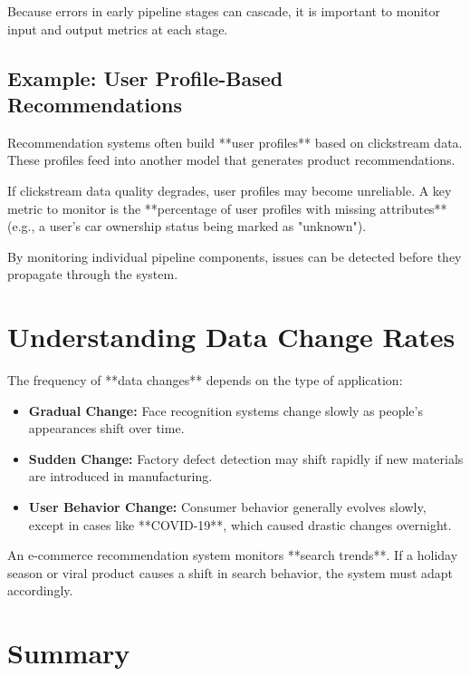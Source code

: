 \documentclass[12pt,openany]{book}
\begin{document}
Because errors in early pipeline stages can cascade, it is important to monitor input and output metrics at each stage.

\subsection{Example: User Profile-Based Recommendations}

Recommendation systems often build **user profiles** based on clickstream data. These profiles feed into another model that generates product recommendations.

\begin{examplebox}
   If clickstream data quality degrades, user profiles may become unreliable. A key metric to monitor is the **percentage of user profiles with missing attributes** (e.g., a user's car ownership status being marked as "unknown").
\end{examplebox}

By monitoring individual pipeline components, issues can be detected before they propagate through the system.

\section{Understanding Data Change Rates}

The frequency of **data changes** depends on the type of application:

\begin{itemize}
    \item \textbf{Gradual Change:} Face recognition systems change slowly as people's appearances shift over time.
    \item \textbf{Sudden Change:} Factory defect detection may shift rapidly if new materials are introduced in manufacturing.
    \item \textbf{User Behavior Change:} Consumer behavior generally evolves slowly, except in cases like **COVID-19**, which caused drastic changes overnight.
\end{itemize}

\begin{examplebox}
   An e-commerce recommendation system monitors **search trends**. If a holiday season or viral product causes a shift in search behavior, the system must adapt accordingly.
\end{examplebox}

\section{Summary}
\end{document}
